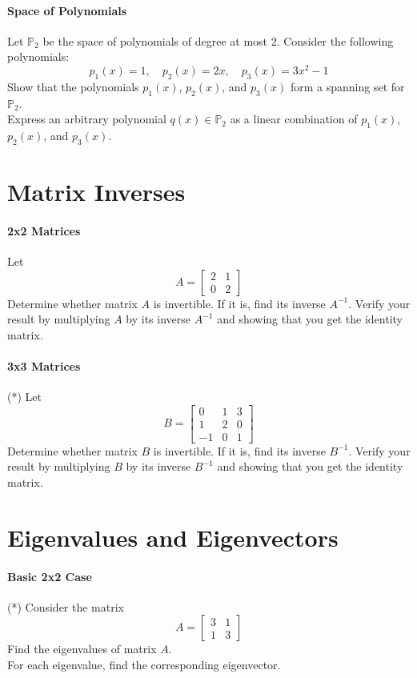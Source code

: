 \documentclass[]{article}
\begin{document}
	\paragraph{Space of Polynomials}
	Let $\mathbb{P}_2$ be the space of polynomials of degree at most 2.
	Consider the following polynomials:
	$$p_1(x) = 1, \quad p_2(x) = 2x, \quad p_3(x) = 3x^2 - 1$$
	Show that the polynomials $p_1(x)$, $p_2(x)$, and $p_3(x)$ form a spanning set for $\mathbb{P}_2$.\\
	Express an arbitrary polynomial $q(x) \in \mathbb{P}_2$ as a linear combination of $p_1(x)$, $p_2(x)$, and $p_3(x)$.
	
	
	\section{Matrix Inverses}
	\paragraph{2x2 Matrices}
	Let
	$$A = \begin{bmatrix}
		2 & 1 \\
		0 & 2
	\end{bmatrix}$$
	Determine whether matrix $A$ is invertible.
	If it is, find its inverse $A^{-1}$.
	Verify your result by multiplying $A$ by its inverse $A^{-1}$ and showing that you get the identity matrix.
	
	\paragraph{3x3 Matrices}
	(*) Let
	$$B = \begin{bmatrix}
		0 & 1 & 3 \\
		1 & 2 & 0 \\
		-1 & 0 & 1
	\end{bmatrix}$$
	Determine whether matrix $B$ is invertible. If it is, find its inverse $B^{-1}$.
	Verify your result by multiplying $B$ by its inverse $B^{-1}$ and showing that you get the identity matrix.
	
	
	\section{Eigenvalues and Eigenvectors}
	\paragraph{Basic 2x2 Case}
	(*) Consider the matrix
	$$A = \begin{bmatrix}
		3 & 1 \\
		1 & 3
	\end{bmatrix}$$
	Find the eigenvalues of matrix $A$.\\
	For each eigenvalue, find the corresponding eigenvector.
	
\end{document}
